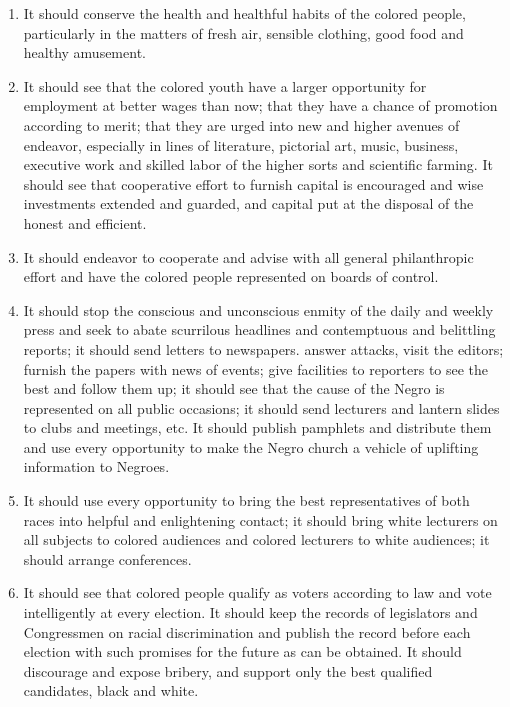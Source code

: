 \documentclass[letterpaper,10pt,english]{jupyterBook}
\begin{document}
\begin{enumerate}
\item {} 
\sphinxAtStartPar
{} It should conserve the health and healthful habits of the colored people, particularly in the matters of fresh air, sensible clothing, good food and healthy amusement.

\item {} 
\sphinxAtStartPar
{} It should see that the colored youth have a larger opportunity for employment at better wages than now; that they have a chance of promotion according to merit; that they are urged into new and higher avenues of endeavor, especially in lines of literature, pictorial art, music, business, executive work and skilled labor of the higher sorts and scientific farming.
It should see that co\sphinxhyphen{}operative effort to furnish capital is encouraged and wise investments extended and guarded, and capital put at the disposal of the honest and efficient.

\item {} 
\sphinxAtStartPar
{} It should endeavor to co\sphinxhyphen{}operate and advise with all general philanthropic effort and have the colored people represented on boards of control.

\item {} 
\sphinxAtStartPar
{} It should stop the conscious and unconscious enmity of the daily and weekly press and seek to abate scurrilous headlines and contemptuous and belittling reports; it should send letters to newspapers. answer attacks, visit the editors; furnish the papers with news of events; give facilities to reporters to see the best and follow them up; it should see that the cause of the Negro is represented on all public occasions; it should send lecturers and lantern slides to clubs and meetings, etc.
It should publish pamphlets and distribute them and use every opportunity to make the Negro church a vehicle of uplifting information to Negroes.

\item {} 
\sphinxAtStartPar
{} It should use every opportunity to bring the best representatives of both races into helpful and enlightening contact; it should bring white lecturers on all subjects to colored audiences and colored lecturers to white audiences; it should arrange conferences.

\item {} 
\sphinxAtStartPar
{} It should see that colored people qualify as voters according to law and vote intelligently at every election. It should keep the records of legislators and Congressmen on racial discrimination and publish the record before each election with such promises for the future as can be obtained. It should discourage and expose bribery, and support only the best qualified candidates, black and white.


\end{enumerate}
\end{document}
